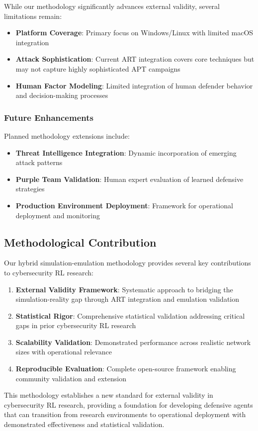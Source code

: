 While our methodology significantly advances external validity, several limitations remain:

\begin{itemize}
    \item \textbf{Platform Coverage}: Primary focus on Windows/Linux with limited macOS integration
    \item \textbf{Attack Sophistication}: Current ART integration covers core techniques but may not capture highly sophisticated APT campaigns
    \item \textbf{Human Factor Modeling}: Limited integration of human defender behavior and decision-making processes
\end{itemize}

\subsubsection{Future Enhancements}

Planned methodology extensions include:

\begin{itemize}
    \item \textbf{Threat Intelligence Integration}: Dynamic incorporation of emerging attack patterns
    \item \textbf{Purple Team Validation}: Human expert evaluation of learned defensive strategies
    \item \textbf{Production Environment Deployment}: Framework for operational deployment and monitoring
\end{itemize}

\subsection{Methodological Contribution}

Our hybrid simulation-emulation methodology provides several key contributions to cybersecurity RL research:

\begin{enumerate}
    \item \textbf{External Validity Framework}: Systematic approach to bridging the simulation-reality gap through ART integration and emulation validation
    
    \item \textbf{Statistical Rigor}: Comprehensive statistical validation addressing critical gaps in prior cybersecurity RL research
    
    \item \textbf{Scalability Validation}: Demonstrated performance across realistic network sizes with operational relevance
    
    \item \textbf{Reproducible Evaluation}: Complete open-source framework enabling community validation and extension
\end{enumerate}

This methodology establishes a new standard for external validity in cybersecurity RL research, providing a foundation for developing defensive agents that can transition from research environments to operational deployment with demonstrated effectiveness and statistical validation.